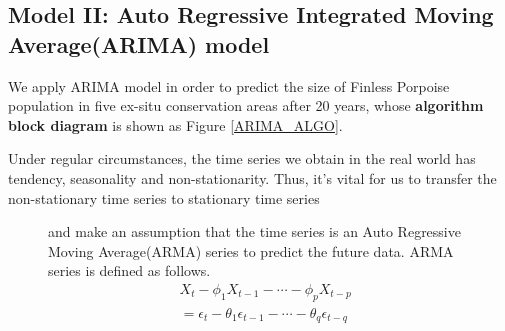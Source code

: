 \documentclass{mcmthesis}
\numberwithin{figure}{section}
\numberwithin{table}{section}
\numberwithin{equation}{section}
\begin{document}
\subsection{Model II: Auto Regressive Integrated Moving Average(ARIMA) model}
We apply ARIMA model in order to predict the size of Finless Porpoise population in five ex-situ 
conservation areas after 20 years, whose \textbf{algorithm block diagram} 
is shown as Figure \ref{ARIMA_ALGO}.
\par
Under regular circumstances, the time series we obtain in the real world
  has tendency, seasonality and non-stationarity. Thus, it's vital for 
  us to transfer the non-stationary time series to stationary time series
\par
\begin{figure}[ht]
\begin{minipage}[htbp]{0.35\linewidth}
  and make an assumption that the time series is an Auto 
  Regressive Moving Average(ARMA) series to predict the 
  future data. ARMA series is defined as follows.
  \begin{align*}
    &X_t-\phi_1X_{t-1}-\cdots -\phi_pX_{t-p} \\
    &= \epsilon_t - \theta_1\epsilon_{t-1}-\cdots-\theta_q\epsilon_{t-q}
  \end{align*}
 

\end{minipage}
\end{figure}
\end{document}
